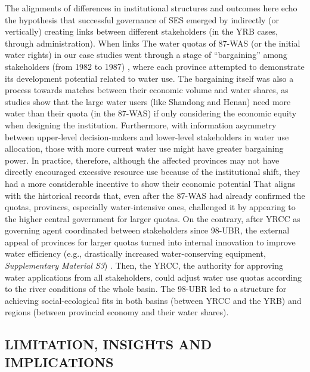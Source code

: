 {The alignments of differences in institutional structures and outcomes here echo the hypothesis that successful governance of SES emerged by indirectly (or vertically) creating links between different stakeholders (in the YRB cases, through administration).
When links The water quotas of 87-WAS (or the initial water rights) in our case studies went through a stage of ``bargaining'' among stakeholders (from 1982 to 1987) \cite{wang2019a, wang2019d}, where each province attempted to demonstrate its development potential related to water use.
The bargaining itself was also a process towards matches between their economic volume and water shares, as studies show that the large water users (like Shandong and Henan) need more water than their quota (in the 87-WAS) if only considering the economic equity when designing the institution.
Furthermore, with information asymmetry between upper-level decision-makers and lower-level stakeholders in water use allocation, those with more current water use might have greater bargaining power.
In practice, therefore, although the affected provinces may not have directly encouraged excessive resource use because of the institutional shift, they had a more considerable incentive to show their economic potential
That aligns with the historical records that, even after the 87-WAS had already confirmed the quotas, provinces, especially water-intensive ones, challenged it by appearing to the higher central government for larger quotas.
On the contrary, after YRCC as governing agent coordinated between stakeholders since 98-UBR, the external appeal of provinces for larger quotas turned into internal innovation to improve water efficiency (e.g., drastically increased water-conserving equipment, \textit{Supplementary Material S3})
\cite{krieger1955, ostrom1990}.
Then, the YRCC, the authority for approving water applications from all stakeholders, could adjust water use quotas according to the river conditions of the whole basin.
The 98-UBR led to a structure for achieving social-ecological fits in both basins (between YRCC and the YRB) and regions (between provincial economy and their water shares).

\subsection{LIMITATION, INSIGHTS AND IMPLICATIONS}
\label{discussion-3}

}
